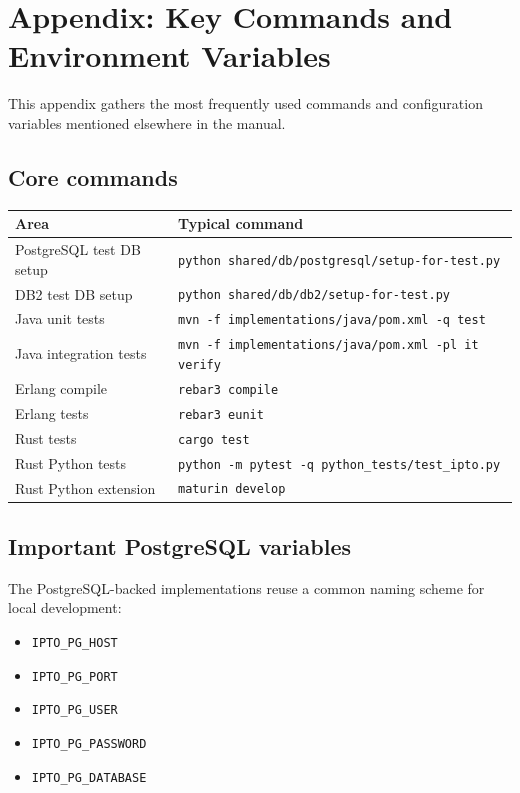 \section{Appendix: Key Commands and Environment Variables}
\label{sec:AppendixOperations}

This appendix gathers the most frequently used commands and configuration variables mentioned elsewhere in the manual.

\subsection{Core commands}

\begin{center}
\begin{tabular}{|p{}|p{}|}
\hline
\textbf{Area} & \textbf{Typical command} \\
\hline
PostgreSQL test DB setup & \texttt{python shared/db/postgresql/setup-for-test.py} \\
\hline
DB2 test DB setup & \texttt{python shared/db/db2/setup-for-test.py} \\
\hline
Java unit tests & \texttt{mvn -f implementations/java/pom.xml -q test} \\
\hline
Java integration tests & \texttt{mvn -f implementations/java/pom.xml -pl it verify} \\
\hline
Erlang compile & \texttt{rebar3 compile} \\
\hline
Erlang tests & \texttt{rebar3 eunit} \\
\hline
Rust tests & \texttt{cargo test} \\
\hline
Rust Python tests & \texttt{python -m pytest -q python\_tests/test\_ipto.py} \\
\hline
Rust Python extension & \texttt{maturin develop} \\
\hline
\end{tabular}
\end{center}

\subsection{Important PostgreSQL variables}

The PostgreSQL-backed implementations reuse a common naming scheme for local development:
\begin{itemize}
\item \texttt{IPTO\_PG\_HOST}
\item \texttt{IPTO\_PG\_PORT}
\item \texttt{IPTO\_PG\_USER}
\item \texttt{IPTO\_PG\_PASSWORD}
\item \texttt{IPTO\_PG\_DATABASE}
\end{itemize}

